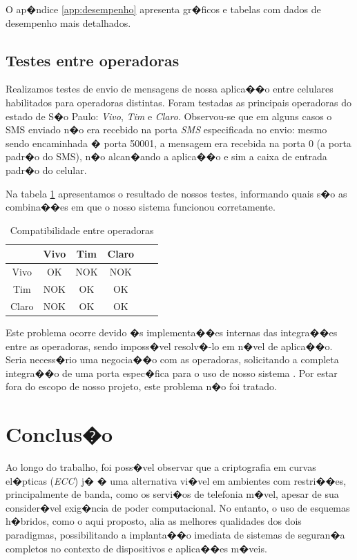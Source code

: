 \documentclass[a4paper,capchap,espacoduplo,normaltoc]{abntepusp}
\begin{document}
O ap�ndice \ref{app:desempenho} apresenta gr�ficos e tabelas com dados de desempenho mais detalhados.

\section{Testes entre operadoras}
Realizamos testes de envio de mensagens de nossa aplica��o entre celulares habilitados para operadoras distintas. Foram testadas as principais operadoras do estado de S�o Paulo: \emph{Vivo}, \emph{Tim} e \emph{Claro}. Observou-se que em alguns casos o SMS enviado n�o era recebido na porta \emph{SMS} especificada no envio: mesmo sendo encaminhada � porta 50001, a mensagem era recebida na porta 0 (a porta padr�o do SMS), n�o alcan�ando a aplica��o e sim a caixa de entrada padr�o do celular.

Na tabela \ref{tab:operadoras} apresentamos o resultado de nossos testes, informando quais s�o as combina��es em que o nosso sistema funcionou corretamente.

\begin{table}[h]\centering
\caption{Compatibilidade entre operadoras}\label{tab:operadoras}
\begin{tabular}{cccccc}\hline
   & Vivo  &  Tim & Claro\\\hline
Vivo & OK & NOK & NOK\\\hline
Tim & NOK & OK & OK\\\hline
Claro & NOK & OK & OK\\\hline
\end{tabular}
\end{table}

Este problema ocorre devido �s implementa��es internas das integra��es entre as operadoras, sendo imposs�vel resolv�-lo em n�vel de aplica��o. Seria necess�rio uma negocia��o com as operadoras, solicitando a completa integra��o de uma porta espec�fica para o uso de nosso sistema . Por estar fora do escopo de nosso projeto, este problema n�o foi tratado.

\chapter{Conclus�o}
Ao longo do trabalho, foi poss�vel observar que a criptografia em curvas el�pticas (\emph{ECC}) j� � uma alternativa vi�vel em ambientes com restri��es, principalmente de banda, como os servi�os de telefonia m�vel, apesar de sua consider�vel exig�ncia de poder computacional. No entanto, o uso de esquemas h�bridos, como o aqui proposto, alia as melhores qualidades dos dois paradigmas, possibilitando a implanta��o imediata de sistemas de seguran�a completos no contexto de dispositivos e aplica��es m�veis.
\end{document}
